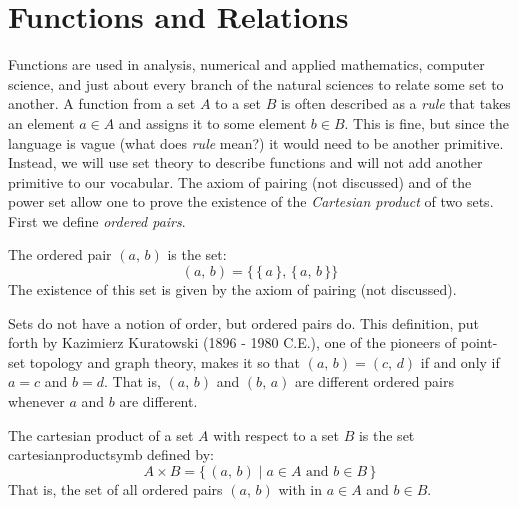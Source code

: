     \section{Functions and Relations}
        Functions are used in analysis, numerical and applied mathematics,
        computer science, and just about every branch of the natural sciences
        to relate some set to another. A function from a set $A$ to a set $B$
        is often described as a \textit{rule} that takes an element $a\in{A}$
        and assigns it to some element $b\in{B}$. This is fine, but since the
        language is vague (what does \textit{rule} mean?) it would need to be
        another primitive. Instead, we will use set theory to describe functions
        and will not add another primitive to our vocabular. The axiom of
        pairing (not discussed) and of the power set allow one to prove the
        existence of the \textit{Cartesian product} of two sets. First we define
        \textit{ordered pairs}.
        \begin{definition}
            The \gls{ordered pair} $(a,\,b)$ is the set:
            \begin{equation}
                (a,\,b)=\big\{\,\{\,a\,\},\,\{\,a,\,b\,\}\big\}
            \end{equation}
            The existence of this set is given by the axiom of pairing
            (not discussed).
        \end{definition}
        Sets do not have a notion of order, but ordered pairs do. This
        definition, put forth by Kazimierz Kuratowski (1896 - 1980 C.E.),%
        one of the pioneers
        of point-set topology and graph theory, makes it so that
        $(a,\,b)=(c,\,d)$ if and only if $a=c$ and $b=d$. That is,
        $(a,\,b)$ and $(b,\,a)$ are different ordered pairs whenever $a$ and
        $b$ are different.
        \begin{definition}
            The \gls{cartesian product} of a set $A$ with respect to a set $B$
            is the set \gls{cartesianproductsymb} defined
            by:
            \begin{equation}
                A\times{B}=\{\,(a,\,b)\;|\;a\in{A}\textrm{ and }b\in{B}\,\}
            \end{equation}
            That is, the set of all ordered pairs $(a,\,b)$ with in
            $a\in{A}$ and $b\in{B}$.
        \end{definition}
